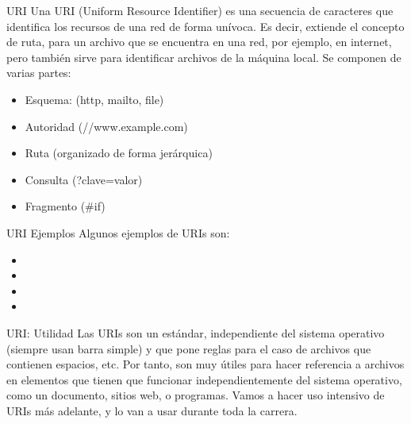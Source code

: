 \begin{frame}[fragile]{URI}
	Una URI (Uniform Resource Identifier) es una secuencia de caracteres que
  identifica los recursos de una red de forma unívoca.
  \jump
  Es decir, extiende el concepto de ruta, para un archivo que se encuentra en
  una red, por ejemplo, en internet, pero también sirve para identificar archivos de
  la máquina local.
	\jump
	Se componen de varias partes:
	\begin{itemize}
		\item Esquema: (http, mailto, file)
		\item Autoridad (//www.example.com)
		\item Ruta (organizado de forma jerárquica)
		\item Consulta (?clave=valor)
		\item Fragmento (\#if)
	\end{itemize}
\end{frame}


\begin{frame}[fragile]{URI Ejemplos}
	Algunos ejemplos de URIs son:
  \begin{itemize}
    \item {}
    \item {}
    \item {}
    \item {}
	\end{itemize}
\end{frame}


\begin{frame}[fragile]{URI: Utilidad}
  Las URIs son un estándar, independiente del sistema operativo (siempre usan
  barra simple) y que pone reglas para el caso de archivos que contienen espacios,
  etc.
  \jump
  Por tanto, son muy útiles para hacer referencia a archivos en elementos que
  tienen que funcionar independientemente del sistema operativo, como un
  documento, sitios web, o programas.
  \jump
  Vamos a hacer uso intensivo de URIs más adelante, y lo van a usar durante
  toda la carrera.
\end{frame}


